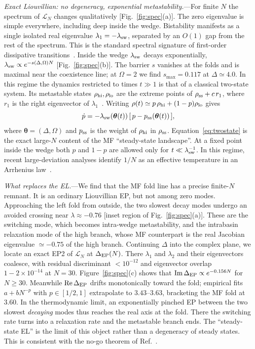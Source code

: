 \documentclass[aps,prl,twocolumn,superscriptaddress,amsmath,amssymb,reprint]{revtex4-2}
\newcommand{\Lc}{\mathcal{L}}
\begin{document}
\emph{Exact Liouvillian: no degeneracy, exponential metastability.}---For finite $N$ the spectrum of $\Lc_N$ changes qualitatively [Fig.~\ref{fig:spec}(a)]. The zero eigenvalue is simple everywhere, including deep inside the wedge. Bistability manifests as a single isolated real eigenvalue $\lambda_1=-\lambda_{\rm sw}$, separated by an $O(1)$ gap from the rest of the spectrum. This is the standard spectral signature of first-order dissipative transitions~\cite{Minganti2018,Casteels2017,Macieszczak2016}. Inside the wedge $\lambda_{\rm sw}$ decays exponentially, $\lambda_{\rm sw}\propto e^{-s(\Delta,\Omega)N}$ [Fig.~\ref{fig:spec}(b)]. The barrier $s$ vanishes at the folds and is maximal near the coexistence line; at $\Omega=2$ we find $s_{\max}=0.117$ at $\Delta\simeq4.0$. In this regime the dynamics restricted to times $t\gg1$ is that of a classical two-state system. Its metastable states $\rho_{\rm hi},\rho_{\rm lo}$ are the extreme points of $\rho_{\rm ss}+c\,r_1$, where $r_1$ is the right eigenvector of $\lambda_1$~\cite{Macieszczak2016}. Writing $\rho(t)\simeq p\,\rho_{\rm hi}+(1-p)\rho_{\rm lo}$ gives
\begin{equation}
\dot p=-\lambda_{\rm sw}(\bm\theta(t))\,[\,p-p_{\rm ss}(\bm\theta(t))\,],
\label{eq:twostate}
\end{equation}
where $\bm\theta=(\Delta,\Omega)$ and $p_{\rm ss}$ is the weight of $\rho_{\rm hi}$ in $\rho_{\rm ss}$. Equation~\eqref{eq:twostate} is the exact large-$N$ content of the MF ``steady-state landscape''. At a fixed point inside the wedge both $p$ and $1-p$ are allowed only for $t\ll\lambda_{\rm sw}^{-1}$. In this regime, recent large-deviation analyses identify $1/N$ as an effective temperature in an Arrhenius law~\cite{Xiang2026}.

\emph{What replaces the EL.}---We find that the MF fold line has a precise finite-$N$ remnant. It is an ordinary Liouvillian EP, but not among zero modes. Approaching the left fold from outside, the two slowest decay modes undergo an avoided crossing near $\lambda\approx-0.76$ [inset region of Fig.~\ref{fig:spec}(a)]. These are the switching mode, which becomes intra-wedge metastability, and the intrabasin relaxation mode of the high branch, whose MF counterpart is the real Jacobian eigenvalue $\simeq-0.75$ of the high branch. Continuing $\Delta$ into the complex plane, we locate an exact EP2 of $\Lc_N$ at $\Delta_{\rm EP}(N)$. There $\lambda_1$ and $\lambda_2$ and their eigenvectors coalesce, with residual discriminant $<10^{-12}$ and eigenvector overlap $1-2\times10^{-14}$ at $N=30$. Figure~\ref{fig:spec}(c) shows that ${\rm Im}\,\Delta_{\rm EP}\propto e^{-0.156N}$ for $N\geq30$. Meanwhile ${\rm Re}\,\Delta_{\rm EP}$ drifts monotonically toward the fold; empirical fits $a+bN^{-p}$ with $p\in[1/2,1]$ extrapolate to $3.43$--$3.63$, bracketing the MF fold at $3.60$. In the thermodynamic limit, an exponentially pinched EP between the two slowest \emph{decaying} modes thus reaches the real axis at the fold. There the switching rate turns into a relaxation rate and the metastable branch ends. The ``steady-state EL'' is the limit of this object rather than a degeneracy of steady states. This is consistent with the no-go theorem of Ref.~\cite{HuBudich2025}.
\end{document}
